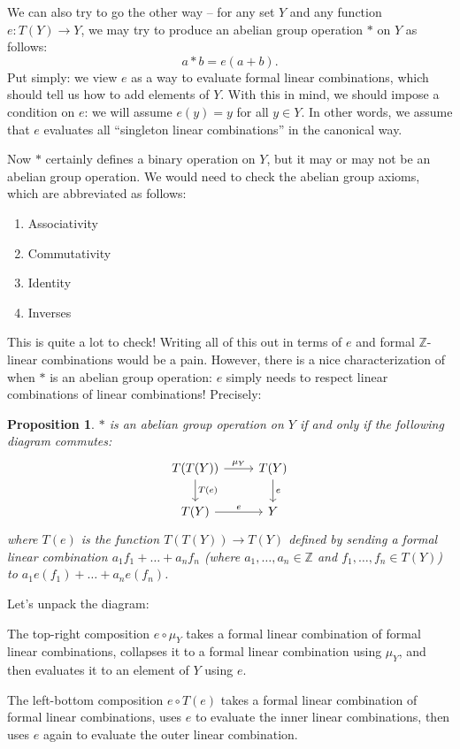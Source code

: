 \documentclass{article}
\newtheorem{prop}{Proposition}
\theoremstyle{definition}
\newcommand{\ZZ}{\mathbb{Z}}
\begin{document}
We can also try to go the other way -- for any set $Y$ and any function $e : T(Y) \to Y$, we may try to produce an abelian group operation $*$ on $Y$ as follows:
\[a * b = e(a + b).\]
Put simply: we view $e$ as a way to evaluate formal linear combinations, which should tell us how to add elements of $Y$. With this in mind, we should impose a condition on $e$: we will assume $e(y) = y$ for all $y \in Y$. In other words, we assume that $e$ evaluates all ``singleton linear combinations'' in the canonical way.

Now $*$ certainly defines a binary operation on $Y$, but it may or may not be an abelian group operation. We would need to check the abelian group axioms, which are abbreviated as follows:
\begin{enumerate}
    \item Associativity
    \item Commutativity
    \item Identity
    \item Inverses
\end{enumerate}
This is quite a lot to check! Writing all of this out in terms of $e$ and formal $\ZZ$-linear combinations would be a pain. However, there is a nice characterization of when $*$ is an abelian group operation: $e$ simply needs to respect linear combinations of linear combinations! Precisely:

\begin{prop}
$*$ is an abelian group operation on $Y$ if and only if the following diagram commutes:
\[\begin{tikzcd}
T(T(Y)) \rar["\mu_Y"] \dar["T(e)"] & T(Y) \dar["e"] \\
T(Y) \rar["e"] & Y
\end{tikzcd}\]
where $T(e)$ is the function $T(T(Y)) \to T(Y)$ defined by sending a formal linear combination $a_1 f_1 + \dots + a_n f_n$ (where $a_1, \dots, a_n \in \ZZ$ and $f_1, \dots, f_n \in T(Y)$) to $a_1 e(f_1) + \dots + a_n e(f_n)$.
\end{prop}

Let's unpack the diagram:

The top-right composition $e \circ \mu_Y$ takes a formal linear combination of formal linear combinations, collapses it to a formal linear combination using $\mu_Y$, and then evaluates it to an element of $Y$ using $e$.

The left-bottom composition $e \circ T(e)$ takes a formal linear combination of formal linear combinations, uses $e$ to evaluate the inner linear combinations, then uses $e$ again to evaluate the outer linear combination.
\end{document}
